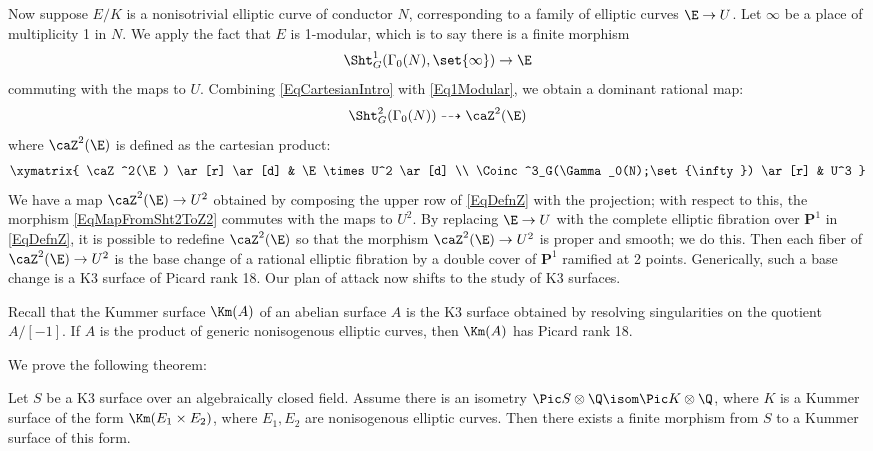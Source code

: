 \documentclass{article}
\newcommand{\jared}[1]{\textcolor{red}{#1}}
\newcommand{\adam}[1]{\textcolor{blue}{#1}}
\def\P{\mathbf{P}}
\begin{document}
Now suppose $E/K$ is a nonisotrivial elliptic curve of conductor $N$, corresponding to a family of elliptic curves $\E\to U$.  Let $\infty$ be a place of multiplicity 1 in $N$.  We apply the fact that $E$ is 1-modular, which is to say there is a finite morphism
\begin{equation}
\label{Eq1Modular}
\Sht^1_G(\Gamma_0(N),\set{\infty})\to \E  \\
 \end{equation}
commuting with the maps to $U$.  Combining \eqref{EqCartesianIntro} with \eqref{Eq1Modular}, we obtain a dominant rational map:
 \begin{equation}
 \label{EqMapFromSht2ToZ2}
 \Sht^2_G(\Gamma_0(N)) \dashrightarrow \caZ^2(\E)
 \end{equation}
where $\caZ^2(\E)$ is defined as the cartesian product:
 \begin{equation}
 \label{EqDefnZ}
 \xymatrix{
\caZ^2(\E) \ar[r] \ar[d] & \E\times U^2 \ar[d] \\
\Coinc^3_G(\Gamma_0(N);\set{\infty}) \ar[r] & U^3
} 
 \end{equation}
We have a map $\caZ^2(\E)\to U^2$ obtained by composing the upper row of \eqref{EqDefnZ} with the projection; with respect to this, the morphism \eqref{EqMapFromSht2ToZ2} commutes with the maps to $U^2$.  By replacing $\E\to U$ with the complete elliptic fibration over $\P^1$ in \eqref{EqDefnZ}, it is possible to redefine $\caZ^2(\E)$ so that the morphism $\caZ^2(\E)\to U^2$ is proper and smooth; we do this.  Then each fiber of $\caZ^2(\E)\to U^2$ is the base change of a rational elliptic fibration by a double cover of $\P^1$ ramified at 2 points.   Generically, such a base change is a K3 surface of Picard rank 18.  Our plan of attack now shifts to the study of K3 surfaces.
  

Recall that the Kummer surface $\Km(A)$ of an abelian surface $A$ is the K3 surface obtained by resolving singularities on the quotient $A/[-1]$.  If $A$ is the product of generic nonisogenous elliptic curves, then $\Km(A)$ has Picard rank 18.

We prove the following theorem:
\begin{thm}  \label{ThmIsogenyBetweenK3s} Let $S$ be a K3 surface over an algebraically closed field.  Assume there is an isometry $\Pic S\otimes\Q\isom \Pic K \otimes\Q$, where $K$ is a Kummer surface of the form $\Km(E_1\times E_2)$, where $E_1,E_2$ are nonisogenous elliptic curves.  Then there exists a finite morphism from $S$ to a Kummer surface of this form.
\end{thm}
\end{document}

